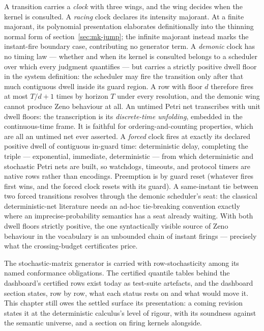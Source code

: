 A transition carries a \emph{clock} with
three wings, and the wing decides when the kernel is consulted. A
\emph{racing} clock declares its intensity majorant. At a finite
majorant, its polynomial presentation elaborates definitionally into
the thinning normal form of section~\ref{sec:mk-jump}; the infinite
majorant instead marks the instant-fire boundary case, contributing
no generator term. A \emph{demonic} clock has no timing law
--- whether and when its kernel is consulted belongs to a scheduler
over which every judgment quantifies --- but carries a strictly
positive dwell floor in the system definition: the scheduler may fire
the transition only after that much contiguous dwell inside its guard
region. A row with floor $d$ therefore fires at most $T/d + 1$ times
by horizon $T$ under every resolution, and the demonic wing cannot
produce Zeno behaviour at all. An untimed Petri net transcribes with
unit dwell floors: the transcription is its \emph{discrete-time
unfolding}, embedded in the continuous-time frame. It is faithful
for ordering-and-counting properties, which are all an untimed net
ever asserted. A
\emph{forced} clock fires at exactly its declared positive dwell of
contiguous in-guard time: deterministic delay, completing the triple
--- exponential, immediate, deterministic --- from which
deterministic and stochastic Petri nets are built, so watchdogs,
timeouts, and protocol timers are native rows rather than encodings.
Preemption is by guard reset (whatever fires first wins, and the
forced clock resets with its guard). A same-instant tie between
two forced transitions resolves through the demonic scheduler's
seat: the classical deterministic-net literature needs an ad-hoc
tie-breaking convention exactly where an imprecise-probability
semantics has a seat already waiting. With both dwell floors
strictly positive, the one syntactically visible source of Zeno
behaviour in the vocabulary is an unbounded chain of instant
firings --- precisely what the crossing-budget certificates price.

The stochastic-matrix generator is
carried with row-stochasticity among its named conformance
obligations. The certified quantile tables behind the dashboard's
certified rows exist today as test-suite artefacts, and the dashboard
section states, row by row, what each status rests on and what would
move it. This chapter still owes the settled surface its
presentation: a coming revision states it at the deterministic
calculus's level of rigour, with its soundness against the semantic
universe, and a section on firing kernels alongside.


